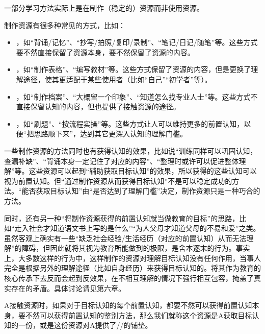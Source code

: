 一部分学习方法实际上是在制作（稳定的）资源而非使用资源。
\begin{explain}
制作资源有很多种常见的方式，比如：
\begin{itemize}
\item{}，如“背诵/记忆”、“抄写/拍照/复印/录制”、“笔记/日记/随笔”等。这些方式要不然直接保留了资源本身，要不然保留了资源的内容。
\item{}，如“制作表格”、“编写教材”等。这些方式保留了资源的内容，但是更换了理解途径，使其更适配于某些使用者（比如“自己”“初学者”等）。
\item{}，如“制作档案”、“大概留一个印象”、“知道怎么找专业人士”等。这些方式不直接保留认知的内容，但也提供了接触资源的途径。
\item{}，如“刷题”、“按流程实操”等。这些方式让人可以维持更多的前置认知，以便“把思路顺下来”，达到其它更深入认知的理解门槛。
\end{itemize}
一些制作资源的方法同时也有获得认知的效果，比如说“训练同样可以巩固认知，查漏补缺”、“背诵本身一定记住了对应的内容”、“整理时或许可以促进整体理解”等。这些资源可以起到“辅助获取目标认知”的效果，所以获得的这些认知可以视为前置认知。但“通过制作资源从而获得目标认知”不是可以稳定成功的方法。“能否获取目标认知”由“是否达到了理解门槛”决定，制作资源只是一种巧合的方法。

同时，还有另一种“将制作资源获得的前置认知就当做教育的目标”的思路，比如“走入社会才知道语文书上写的是什么”“为人父母才知道父母的不易和爱”之类。虽然客观上确实有一些“缺乏社会经验/生活经历（对应的前置认知）从而无法理解”的障碍，但因此就将其视为教育所能做到的极限，是舍本逐末的行为。事实上，大多数这样的行为中，这样制作的资源对理解目标认知没有任何作用，当事人完全是根据另外的理解途径（比如自身经历）来获得目标认知的。将其作为教育的核心传承下去反而会起到反效果，在不相互理解的情况下强行相互包容，掩盖了真实存在的矛盾。具体讨论请见第六章。
\end{explain}
A接触资源时，如果对于目标认知的每个前置认知，都要不然可以获得前置认知本身，要不然可以获得前置认知的鉴别方法，那么我们就称这个资源是A获取目标认知的一份，或是这份资源对A提供了//的铺垫。
